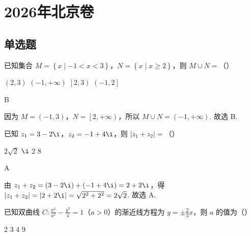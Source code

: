 \documentclass[UTF8,a4paper,oneside,11pt]{ctexbook}
\begin{document}
\mainmatter

\chapter{2026年北京卷}

\section{单选题}

\begin{problem}
已知集合 \( M=\left\{ x\mid -1<x<3 \right\} \)，\( N=\left\{ x\mid x\ge 2 \right\} \)，则 \( M\cup N=\)（\quad）

\choices
    {\( \left( 2,3 \right) \)}
    {\( \left( -1,+\infty \right) \)}
    {\( \left[ 2,3 \right) \)}
    {\( \left( -1,2 \right] \)}
\end{problem}

\begin{answer}
B
\end{answer}

\begin{solution}
因为 \( M=\left( -1,3 \right) \)，\( N=\left[ 2,+\infty \right) \)，所以 \( M\cup N=\left( -1,+\infty \right) \). 故选 B.
\end{solution}

\begin{problem}
已知 \( z_1=3-2\i \)，\( z_2=-1+4\i \)，则 \( \left| z_1+z_2 \right|=\)（\quad）

\choices
    {\( 2\sqrt{2} \)}
    {\( \i \)}
    {2}
    {8}
\end{problem}

\begin{answer}
A
\end{answer}

\begin{solution}
由 \( z_1+z_2=\left( 3-2\i \right)+\left( -1+4\i \right)=2+2\i \)，得 \( \left| z_1+z_2 \right|=\left| 2+2\i \right|=\sqrt{2^2+2^2}=2\sqrt{2} \). 故选 A.
\end{solution}

\begin{problem}
已知双曲线 \( C:\frac{x^2}{a^2}-\frac{y^2}{4}=1 \)（\( a>0 \)）的渐近线方程为 \( y=\pm \frac{2}{3}x \)，则 \( a \) 的值为（\quad）

\choices
    {2}
    {3}
    {4}
    {9}
\end{problem}
\end{document}
